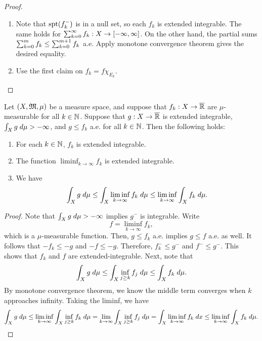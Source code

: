 \documentclass[a4paper]{article}
\begin{document}
\begin{proof}
\begin{enumerate}
  \item Note that $\operatorname{spt}(f_k^-)$ is in a null set, so each $f_k$ is
  extended integrable. The same holds for $\sum_{k=0}^\infty f_k :
  X \to [-\infty, \infty]$. On the other hand, the partial sums
  $\sum_{k=0}^m f_k \leq \sum_{k=0}^{m+1} f_k$ a.e. Apply monotone
  convergence theorem gives the desired equality.

  \item Use the first claim on $f_k = f \chi_{E_k}$.
\end{enumerate}
\end{proof}

\begin{thm}
Let $(X, \mathfrak{M}, \mu)$ be a measure space, and suppose
that $f_k : X \to \overline{\mathbb{R}}$ are $\mu$-measurable
for all $k \in \mathbb{N}$. Suppose that $g : X \to \overline{\mathbb{R}}$ is
extended integrable, $\int_X g \; d \mu > - \infty$, and
$g \leq f_k$ a.e. for all $k \in \mathbb{N}$. Then the following
holds:
\begin{enumerate}
\item For each $k \in \mathbb{N}$, $f_k$ is extended integrable.
\item The function $\liminf_{k \to \infty} f_k$
is extended integrable.
\item We have
\[
\int_X g \; d \mu \leq \int_X \liminf_{k \to \infty}
f_k \; d \mu \leq \liminf_{k \to \infty} \int_X f_k \; d \mu.
\]
\end{enumerate}
\end{thm}

\begin{proof}
Note that $\int_X g \; d \mu > - \infty$ implies $g^-$ is
integrable. Write
\[
  f = \liminf_{k \to \infty} f_k,
\]
which is
a $\mu$-measurable function. Then, $g \leq f_k$ a.e. implies
$g \leq f$ a.e. as well. It follows that $-f_k \leq -g$
and $-f \leq -g$. Therefore,
$f_k^- \leq g^-$ and $f^- \leq g^-$.
This shows that
$f_k$ and $f$ are extended-integrable. Next, note that
\[
\int_X g \; d \mu \leq \int_X \inf_{j \geq k} f_j \; d \mu
\leq \int_X f_k \; d \mu.
\]
By monotone convergence theorem, we know the middle term
converges when $k$ approaches infinity.
Taking the liminf, we have
\[
\int_X g \; d \mu
\leq
\liminf_{k \to \infty} \int_X \inf_{j \geq k} f_k \; d \mu
= \lim_{k \to \infty} \int_X \inf_{j \geq k} f_j \; d \mu
= \int_X \liminf_{k \to \infty} f_k \; d x
\leq \liminf_{k \to \infty} \int_X f_k \; d \mu.
\]
\end{proof}
\end{document}
